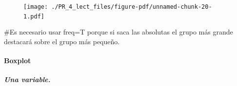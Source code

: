 \documentclass[
  letterpaper,
  DIV=11,
  numbers=noendperiod]{scrreprt}
\let\oldparagraph\paragraph
\renewcommand{\paragraph}[1]{\oldparagraph{#1}\mbox{}}
\let\oldsubparagraph\subparagraph
\renewcommand{\subparagraph}[1]{\oldsubparagraph{#1}\mbox{}}
\newenvironment{Shaded}{\begin{snugshade}}{\end{snugshade}}
\newcommand{\AttributeTok}[1]{\textcolor[rgb]{0.40,0.45,0.13}{#1}}
\newcommand{\CommentTok}[1]{\textcolor[rgb]{0.37,0.37,0.37}{#1}}
\newcommand{\DecValTok}[1]{\textcolor[rgb]{0.68,0.00,0.00}{#1}}
\newcommand{\FunctionTok}[1]{\textcolor[rgb]{0.28,0.35,0.67}{#1}}
\newcommand{\NormalTok}[1]{\textcolor[rgb]{0.00,0.23,0.31}{#1}}
\newcommand{\SpecialCharTok}[1]{\textcolor[rgb]{0.37,0.37,0.37}{#1}}
\newcommand{\StringTok}[1]{\textcolor[rgb]{0.13,0.47,0.30}{#1}}
\begin{document}
\begin{Shaded}
\end{Shaded}

\begin{figure}[H]

{\centering \texttt{[image: ./PR\_4\_lect\_files/figure-pdf/unnamed-chunk-20-1.pdf]}

}

\end{figure}

\begin{Shaded}
\begin{Highlighting}[]
\CommentTok{\#Es necesario usar freq=T porque si saca las absolutas el grupo más grande destacará sobre el grupo más pequeño.}
\end{Highlighting}
\end{Shaded}

\hypertarget{boxplot}{%
\paragraph{Boxplot}\label{boxplot}}

\hypertarget{una-variable.}{%
\subparagraph{Una variable.}\label{una-variable.}}

\begin{Shaded}
\end{Shaded}
\end{document}
